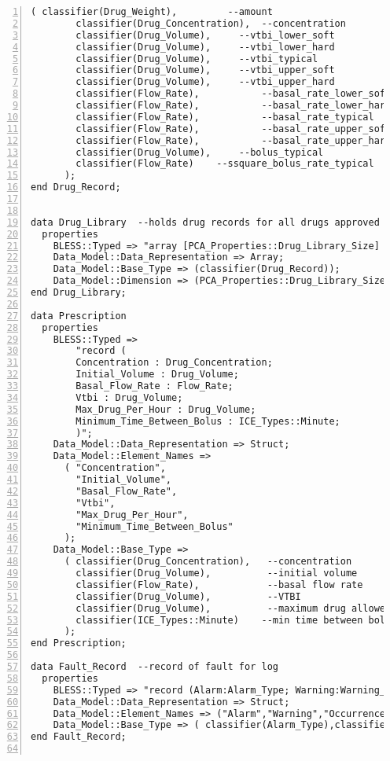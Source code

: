 \begin{lstlisting}[language=aadl, gobble=0, numbers=left, caption={\lstinline{PCA_Types} package}, label={listing:aadl:pca_types}]
      ( classifier(Drug_Weight),         --amount
      	classifier(Drug_Concentration),  --concentration
      	classifier(Drug_Volume),     --vtbi_lower_soft
      	classifier(Drug_Volume),     --vtbi_lower_hard
      	classifier(Drug_Volume),     --vtbi_typical
      	classifier(Drug_Volume),     --vtbi_upper_soft
      	classifier(Drug_Volume),     --vtbi_upper_hard
      	classifier(Flow_Rate),           --basal_rate_lower_soft
      	classifier(Flow_Rate),           --basal_rate_lower_hard
      	classifier(Flow_Rate),           --basal_rate_typical
      	classifier(Flow_Rate),           --basal_rate_upper_soft
      	classifier(Flow_Rate),           --basal_rate_upper_hard
      	classifier(Drug_Volume),     --bolus_typical
      	classifier(Flow_Rate)    --ssquare_bolus_rate_typical
      );
end Drug_Record;


data Drug_Library  --holds drug records for all drugs approved by the hospital pharmacy
  properties
    BLESS::Typed => "array [PCA_Properties::Drug_Library_Size] of PCA_Types::Drug_Record";
    Data_Model::Data_Representation => Array;
    Data_Model::Base_Type => (classifier(Drug_Record));
    Data_Model::Dimension => (PCA_Properties::Drug_Library_Size);
end Drug_Library;
  
data Prescription
  properties
    BLESS::Typed => 
		"record (
		Concentration : Drug_Concentration;
		Initial_Volume : Drug_Volume;
		Basal_Flow_Rate : Flow_Rate;
		Vtbi : Drug_Volume;
		Max_Drug_Per_Hour : Drug_Volume;
		Minimum_Time_Between_Bolus : ICE_Types::Minute;
		)";
    Data_Model::Data_Representation => Struct;
    Data_Model::Element_Names => 
      ( "Concentration",
		"Initial_Volume",
		"Basal_Flow_Rate",
		"Vtbi",
		"Max_Drug_Per_Hour",
		"Minimum_Time_Between_Bolus"
      );
    Data_Model::Base_Type => 
      ( classifier(Drug_Concentration),   --concentration
        classifier(Drug_Volume),          --initial volume
        classifier(Flow_Rate),            --basal flow rate
        classifier(Drug_Volume),          --VTBI
        classifier(Drug_Volume),          --maximum drug allowed per hour
        classifier(ICE_Types::Minute)    --min time between bolus doses        
      );
end Prescription;  
  
data Fault_Record  --record of fault for log
  properties
    BLESS::Typed => "record (Alarm:Alarm_Type; Warning:Warning_Type; Occurrence_Time:BLESS_Types::Time;)";
    Data_Model::Data_Representation => Struct;
    Data_Model::Element_Names => ("Alarm","Warning","Occurrence_Time");
    Data_Model::Base_Type => ( classifier(Alarm_Type),classifier(Warning_Type),classifier(BLESS_Types::Time));
end Fault_Record;  


\end{lstlisting}
